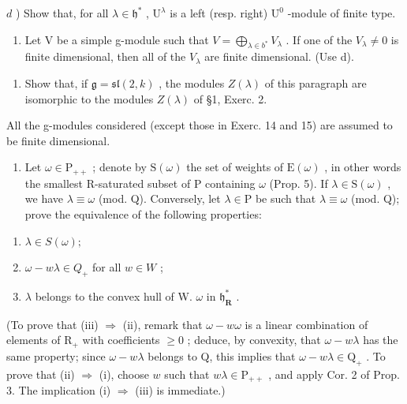 \(d\) ) Show that, for all \(\lambda \in \mathfrak{h}^*\) , \(\mathrm{U}^{\lambda}\) is a left (resp. right) \(\mathrm{U}^0\) -module of finite type.

\begin{enumerate}
\def\labelenumi{\alph{enumi})}
\setcounter{enumi}{4}
\tightlist
\item
  Let V be a simple g-module such that \(V = \bigoplus_{\lambda \in b^{*}} V_{\lambda}\) . If one of the \(V_{\lambda} \neq 0\) is finite dimensional, then all of the \(V_{\lambda}\) are finite dimensional. (Use d).
\end{enumerate}

\begin{enumerate}
\def\labelenumi{\arabic{enumi})}
\setcounter{enumi}{4}
\tightlist
  \item
  Show that, if \(\mathfrak{g} = \mathfrak{sl}(2,k)\) , the modules \(Z(\lambda)\) of this paragraph are isomorphic to the modules \(Z(\lambda)\) of §1, Exerc. 2.
\end{enumerate}


All the g-modules considered (except those in Exerc. 14 and 15) are assumed to be finite dimensional.

\begin{enumerate}
\def\labelenumi{\arabic{enumi})}
\tightlist
\item
  Let \(\omega \in \mathrm{P}_{++}\) ; denote by \(\mathrm{S}(\omega)\) the set of weights of \(\mathrm{E}(\omega)\) , in other words the smallest R-saturated subset of P containing \(\omega\) (Prop. 5). If \(\lambda \in \mathrm{S}(\omega)\) , we have \(\lambda \equiv \omega\) (mod. Q). Conversely, let \(\lambda \in \mathrm{P}\) be such that \(\lambda \equiv \omega\) (mod. Q); prove the equivalence of the following properties:
\end{enumerate}

\begin{enumerate}
\def\labelenumi{(\roman{enumi})}
\item
  \(\lambda \in S(\omega);\)
\item
  \(\omega - w\lambda \in Q_{+}\) for all \(w \in W\) ;
\item
  \(\lambda\) belongs to the convex hull of W. \(\omega\) in \(\mathfrak{h}_{\mathbf{R}}^{*}\) .
\end{enumerate}

(To prove that (iii) \(\Longrightarrow\) (ii), remark that \(\omega - w\omega\) is a linear combination of elements of \(\mathrm{R}_{+}\) with coefficients \(\geq 0\) ; deduce, by convexity, that \(\omega - w\lambda\) has the same property; since \(\omega - w\lambda\) belongs to Q, this implies that \(\omega - w\lambda \in \mathrm{Q}_{+}\) . To prove that (ii) \(\Longrightarrow\) (i), choose \(w\) such that \(w\lambda \in \mathrm{P}_{++}\) , and apply Cor. 2 of Prop. 3. The implication (i) \(\Longrightarrow\) (iii) is immediate.)

